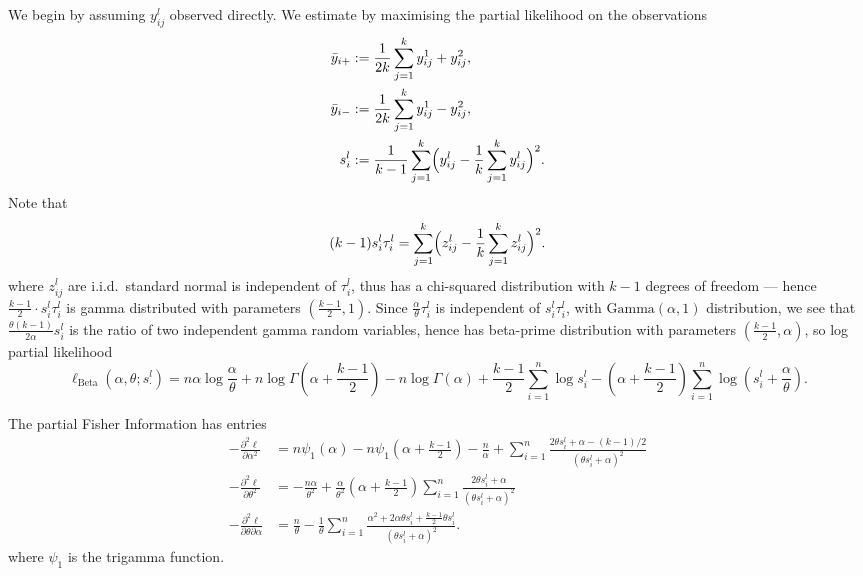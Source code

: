 \documentclass[
]{article}
\begin{document}
We begin by assuming \(y_{ij}^l\) observed directly. We estimate by
maximising the partial likelihood on the observations \begin{align*}
  \bar{y}_{i+}&:= \frac{1}{2k} \sum_{j=1}^k y_{ij}^1 + y_{ij}^2,\\
  \bar{y}_{i-}&:= \frac{1}{2k} \sum_{j=1}^k y_{ij}^1 - y_{ij}^2,\\
  s_i^l&:=  \frac{1}{k-1}\sum_{j=1}^k \Bigl( y_{ij}^l - \frac{1}{k} \sum_{j=1}^k y_{ij}^l \Bigr)^2.
\end{align*} Note that \begin{equation}
(k-1)s_i^l \tau_i^l =\sum_{j=1}^k \Bigl( z_{ij}^l - \frac{1}{k} \sum_{j=1}^k z_{ij}^l \Bigr)^2.
\end{equation} where \(z_{ij}^l\) are i.i.d.~standard normal is
independent of \(\tau_i^l\), thus has a chi-squared distribution with
\(k-1\) degrees of freedom --- hence
\(\frac{k-1}{2}\cdot s_i^l\tau_i^l\) is gamma distributed with
parameters \((\frac{k-1}{2},1)\). Since
\(\frac{\alpha}{\theta}\tau_i^l\) is independent of \(s_i^l\tau_i^l\),
with \(\mathrm{Gamma}(\alpha,1)\) distribution, we see that
\(\frac{\theta(k-1)}{2\alpha}s_i^l\) is the ratio of two independent
gamma random variables, hence has beta-prime distribution with
parameters \(\left(\frac{k-1}{2}, \alpha \right)\), so log partial
likelihood \begin{equation}
  \ell_{\operatorname{Beta}}(\alpha,\theta;s^l_\cdot)=n\alpha \log\frac{\alpha}{\theta}+n\log\Gamma\left(\alpha+\frac{k-1}{2}\right)-n\log\Gamma(\alpha)
  + \frac{k-1}{2} \sum_{i=1}^n \log s_i^l -\left(\alpha+\frac{k-1}{2}\right) \sum_{i=1}^n \log \left(s_i^l+\frac\alpha\theta\right).
\end{equation}

The partial Fisher Information has entries \begin{align*}
 -\frac{\partial^2 \ell}{\partial \alpha^2} &= n\psi_1\left(\alpha\right) - n\psi_1\left(\alpha+\frac{k-1}{2}\right)
  - \frac{n}{\alpha} +\sum_{i=1}^n \frac{2\theta s_i^l + \alpha-(k-1)/2}{(\theta s_i^l + \alpha)^2}\\
-\frac{\partial^2 \ell}{\partial \theta^2} &=
   -\frac{n \alpha}{\theta^2} +\frac{\alpha}{\theta^2}\left(\alpha+\frac{k-1}{2}\right)\sum_{i=1}^n \frac{2\theta s_i^l + \alpha}{(\theta s_i^l + \alpha)^2}\\
-\frac{\partial^2 \ell}{\partial \theta\partial\alpha} &= \frac{n}{\theta}-
   \frac1\theta \sum_{i=1}^n \frac{\alpha^2+2\alpha\theta s_i^l+\frac{k-1}{2}\theta s_i^l}{(\theta s_i^l + \alpha)^2}.
\end{align*} where \(\psi_1\) is the trigamma function.
\end{document}
